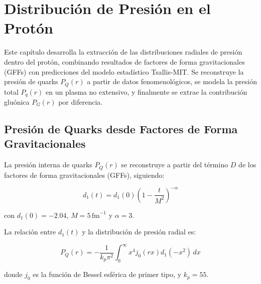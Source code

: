 \chapter{Distribuci\'on de Presi\'on en el Prot\'on}\label{ch:TotalPandGluons}

\fancyhf{} %

\begin{chaptersummary}
Este cap\'itulo desarrolla la extracci\'on de las distribuciones radiales de presi\'on dentro del prot\'on, combinando resultados de factores de forma gravitacionales (GFFs) con predicciones del modelo estad\'istico Tsallis-MIT. Se reconstruye la presi\'on de quarks $P_Q(r)$ a partir de datos fenomenol\'ogicos, se modela la presi\'on total $P_q(r)$ en un plasma no extensivo, y finalmente se extrae la contribuci\'on glu\'onica $P_G(r)$ por diferencia.
\end{chaptersummary}

\section{Presi\'on de Quarks desde Factores de Forma Gravitacionales}
La presi\'on interna de quarks $P_Q(r)$ se reconstruye a partir del t\'ermino $D$ de los factores de forma gravitacionales (GFFs), siguiendo:

\begin{equation}
d_1(t) = d_1(0) \left( 1 - \frac{t}{M^2} \right)^{-\alpha}
\end{equation}

con $d_1(0) = -2.04$, $M = 5\,\mathrm{fm}^{-1}$ y $\alpha = 3$.

La relaci\'on entre $d_1(t)$ y la distribuci\'on de presi\'on radial es:

\begin{equation}
P_Q(r) = -\frac{1}{k_p \pi^2} \int_0^\infty x^4 j_0(r x) d_1(-x^2) \, dx
\end{equation}

donde $j_0$ es la funci\'on de Bessel esf\'erica de primer tipo, y $k_p = 55$.

